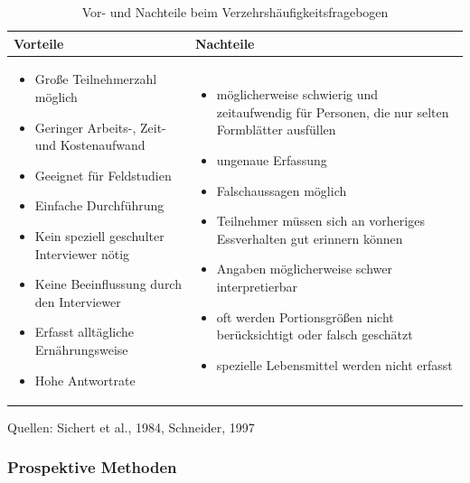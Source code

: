 \begin{table}[!h]
\begin{flushleft}
\caption{Vor- und Nachteile beim Verzehrshäufigkeitsfragebogen}
\end{flushleft}
\begin{tabular}{p{7cm} p{7cm}}
Vorteile & Nachteile \\
\hline

\begin{itemize}
\item Große Teilnehmerzahl möglich
\item Geringer Arbeits-, Zeit- und Kostenaufwand
\item Geeignet für Feldstudien
\item Einfache Durchführung
\item Kein speziell geschulter Interviewer nötig
\item Keine Beeinflussung durch den Interviewer
\item Erfasst alltägliche Ernährungsweise
\item Hohe Antwortrate


\end{itemize}

&

\begin{itemize}
\item möglicherweise schwierig und zeitaufwendig für Personen, die nur selten Formblätter ausfüllen
\item ungenaue Erfassung
\item Falschaussagen möglich
\item Teilnehmer müssen sich an vorheriges Essverhalten gut erinnern können
\item Angaben möglicherweise schwer interpretierbar
\item oft werden Portionsgrößen nicht berücksichtigt oder falsch geschätzt
\item spezielle Lebensmittel werden nicht erfasst


\end{itemize}
\end{tabular}
\label{tab:Verzehrshäufigkeitsfragebogen}
Quellen: Sichert et al., 1984, Schneider, 1997
\end{table}




\subsubsection{Prospektive Methoden}


